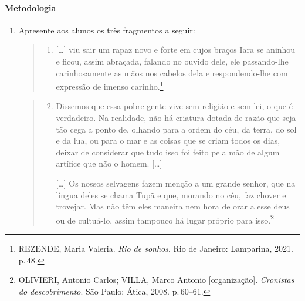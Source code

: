 \documentclass{extrarticle}
\begin{document}
\paragraph{Metodologia}
\begin{enumerate}
\item Apresente aos alunos os três fragmentos a seguir:


\begin{quote}
\begin{enumerate}
\item{[}\ldots{}{]} viu sair um rapaz novo e forte em cujos braços Iara
se aninhou e ficou, assim abraçada, falando no ouvido dele, ele
passando-lhe carinhosamente as mãos nos cabelos dela e
respondendo-lhe com expressão de imenso carinho.\footnote{REZENDE, Maria Valeria. \emph{Rio de sonhos}. Rio de Janeiro: Lamparina, 2021. p.\,48.}
\end{enumerate}
\end{quote}

\begin{quote}
\begin{enumerate}
\setcounter{enumii}{1}
\item Dissemos que essa pobre gente vive sem religião e sem lei, o que é
verdadeiro. Na realidade, não há criatura dotada de razão que seja
tão cega a ponto de, olhando para a ordem do céu, da terra, do sol e
da lua, ou para o mar e as coisas que se criam todos os dias, deixar
de considerar que tudo isso foi feito pela mão de algum artífice que
não o homem. {[}\ldots{}{]}


{[}\ldots{}{]} Os nossos selvagens fazem menção a um grande senhor,
que na língua deles se chama Tupã e que, morando no céu, faz chover
e trovejar. Mas não têm eles maneira nem hora de orar a esse deus ou
de cultuá-lo, assim tampouco há lugar próprio para isso.\footnote{OLIVIERI, Antonio Carlos; VILLA, Marco Antonio {[}organização{]}. \emph{Cronistas do descobrimento}. São Paulo: Ática, 2008. p.\,60--61.}
\end{enumerate}
\end{quote}



\end{enumerate}
\end{document}
